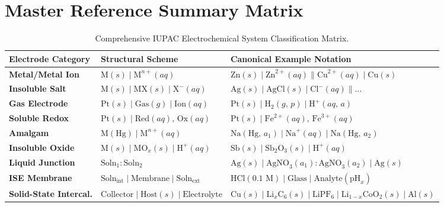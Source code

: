 \documentclass[10pt,a4paper]{article}
\begin{document}
\newpage
\section{Master Reference Summary Matrix}

\begin{table}[htbp]
\centering
\small
\renewcommand{\arraystretch}{1.35}
\begin{tabular}{p{3.2cm} p{4.2cm} p{7.5cm}}
\toprule
\textbf{Electrode Category} & \textbf{Structural Scheme} & \textbf{Canonical Example Notation} \\
\midrule
\textbf{Metal/Metal Ion} & $\text{M}(s) \mid \text{M}^{n+}(aq)$ & $\text{Zn}(s) \mid \text{Zn}^{2+}(aq) \parallel \text{Cu}^{2+}(aq) \mid \text{Cu}(s)$ \\
\textbf{Insoluble Salt} & $\text{M}(s) \mid \text{MX}(s) \mid \text{X}^-(aq)$ & $\text{Ag}(s) \mid \text{AgCl}(s) \mid \text{Cl}^-(aq) \parallel \dots$ \\
\textbf{Gas Electrode} & $\text{Pt}(s) \mid \text{Gas}(g) \mid \text{Ion}(aq)$ & $\text{Pt}(s) \mid \text{H}_2(g,\, p) \mid \text{H}^+(aq,\, a)$ \\
\textbf{Soluble Redox} & $\text{Pt}(s) \mid \text{Red}(aq),\, \text{Ox}(aq)$ & $\text{Pt}(s) \mid \text{Fe}^{2+}(aq),\, \text{Fe}^{3+}(aq)$ \\
\textbf{Amalgam} & $\text{M}(\text{Hg}) \mid \text{M}^{n+}(aq)$ & $\text{Na}(\text{Hg},\, a_1) \mid \text{Na}^+(aq) \mid \text{Na}(\text{Hg},\, a_2)$ \\
\textbf{Insoluble Oxide} & $\text{M}(s) \mid \text{MO}_x(s) \mid \text{H}^+(aq)$ & $\text{Sb}(s) \mid \text{Sb}_2\text{O}_3(s) \mid \text{H}^+(aq)$ \\
\textbf{Liquid Junction} & $\text{Soln}_1 : \text{Soln}_2$ & $\text{Ag}(s) \mid \text{AgNO}_3(a_1) : \text{AgNO}_3(a_2) \mid \text{Ag}(s)$ \\
\textbf{ISE Membrane} & $\text{Soln}_{\text{int}} \mid \text{Membrane} \mid \text{Soln}_{\text{ext}}$ & $\text{HCl}(0.1\text{ M}) \mid \text{Glass} \mid \text{Analyte}(\text{pH}_x)$ \\
\textbf{Solid-State Intercal.} & $\text{Collector} \mid \text{Host}(s) \mid \text{Electrolyte}$ & $\text{Cu}(s) \mid \text{Li}_x\text{C}_6(s) \mid \text{LiPF}_6 \mid \text{Li}_{1-x}\text{CoO}_2(s) \mid \text{Al}(s)$ \\
\bottomrule
\end{tabular}
\caption{Comprehensive IUPAC Electrochemical System Classification Matrix.}
\end{table}
\end{document}
